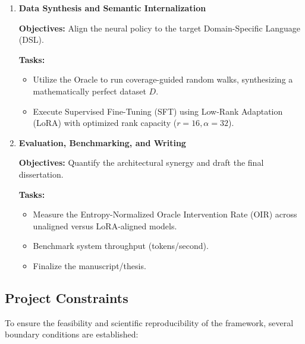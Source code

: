 \begin{enumerate}
\textbf{Objectives:} Integrate the Syntax Oracle into the autoregressive decoding loop.

\textbf{Tasks:}
\begin{itemize}
\item Subclass the \texttt{LogitsProcessor} to inject the token-level $O(1)$ FSM mask.
\item Implement the element-level trigger hooks.
\item Engineer the speculative cache rollback mechanism to 
truncate and regenerate upon Context-Sensitive Invariant (CSI) violations.
\end{itemize}

\item \textbf{Data Synthesis and Semantic Internalization}

\textbf{Objectives:} Align the neural policy to the target Domain-Specific Language (DSL).

\textbf{Tasks:}
\begin{itemize}
\item Utilize the Oracle to run coverage-guided random walks, 
synthesizing a mathematically perfect dataset $D$.
\item Execute Supervised Fine-Tuning (SFT) using Low-Rank 
Adaptation (LoRA) with optimized rank capacity ($r=16, \alpha=32$).
\end{itemize}

\item \textbf{Evaluation, Benchmarking, and Writing}

\textbf{Objectives:} Quantify the architectural synergy and draft the final dissertation.

\textbf{Tasks:}
\begin{itemize}
\item Measure the Entropy-Normalized Oracle Intervention Rate (OIR) 
across unaligned versus LoRA-aligned models.
\item Benchmark system throughput (tokens/second).
\item Finalize the manuscript/thesis.
\end{itemize}
\end{enumerate}

\subsection{Project Constraints}
To ensure the feasibility and scientific reproducibility of the framework, several boundary conditions are established:

